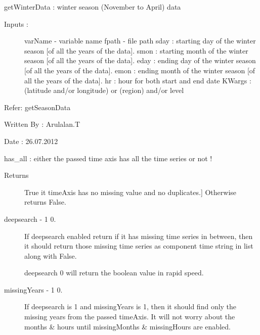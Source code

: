 \documentclass[letterpaper,10pt,english]{sphinxmanual}
\begin{document}
\begin{fulllineitems}
\begin{fulllineitems}
\label{diagnosisutils:xml_data_access.TimeUtility.getWinterData}
getWinterData : winter season (November to April) data
\begin{description}
\item[{Inputs :}] \leavevmode
varName - variable name
fpath - file path
sday : starting day of the winter season {[}of all the years of the data{]}.
smon : starting month of the winter season {[}of all the years of the data{]}.
eday : ending day of the winter season {[}of all the years of the data{]}.
emon : ending month of the winter season {[}of all the years of the data{]}.
hr : hour for both start and end date
KWargs : (latitude and/or longitude) or (region) and/or level

\end{description}

Refer: getSeasonData

Written By : Arulalan.T

Date : 26.07.2012

\end{fulllineitems}


\begin{fulllineitems}
\label{diagnosisutils:xml_data_access.TimeUtility.has_all}
has\_all : either the passed time axis has all the time series or not !
\begin{description}
\item[{Returns}] \leavevmode{[}True it timeAxis has no missing value and no duplicates.{]}
Otherwise returns False.

\item[{deepsearch - 1 \textbar{} 0.}] \leavevmode
If deepsearch enabled return if it has missing time series
in between, then it should return those missing time series
as component time string in list along with False.

deepsearch 0 will return the boolean value in rapid speed.

\item[{missingYears - 1 \textbar{} 0.}] \leavevmode
If deepsearch is 1 and missingYears is 1, then it should find
only the missing years from the passed timeAxis. It will not
worry about the months \& hours until missingMonths \&
missingHours are enabled.


\end{description}
\end{fulllineitems}
\end{fulllineitems}
\end{document}
